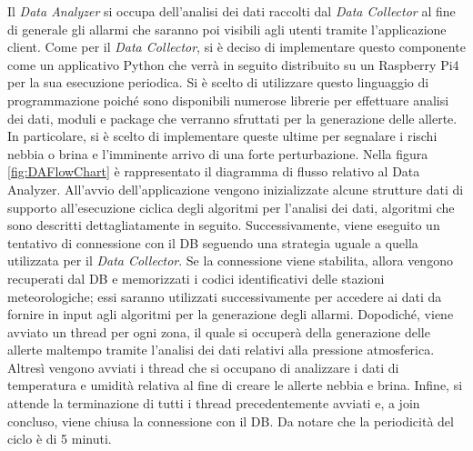 Il \textit{Data Analyzer} si occupa dell'analisi dei dati raccolti dal \textit{Data Collector} al fine di generale gli allarmi che saranno poi visibili agli utenti tramite l'applicazione client. Come per il \textit{Data Collector}, si è deciso di implementare questo componente come un applicativo Python che verrà in seguito distribuito su un Raspberry Pi4 per la sua esecuzione periodica. Si è scelto di utilizzare questo linguaggio di programmazione poiché sono disponibili numerose librerie per effettuare analisi dei dati, moduli e package che verranno sfruttati per la generazione delle allerte. In particolare, si è scelto di implementare queste ultime per segnalare i rischi nebbia o brina e l'imminente arrivo di una forte perturbazione. Nella figura \ref{fig:DAFlowChart} è rappresentato il diagramma di flusso relativo al Data Analyzer. All'avvio dell'applicazione vengono inizializzate alcune strutture dati di supporto all'esecuzione ciclica degli algoritmi per l'analisi dei dati, algoritmi che sono descritti dettagliatamente in seguito. Successivamente, viene eseguito un tentativo di connessione con il DB seguendo una strategia uguale a quella utilizzata per il \textit{Data Collector}. Se la connessione viene stabilita, allora vengono recuperati dal DB e memorizzati i codici identificativi delle stazioni meteorologiche; essi saranno utilizzati successivamente per accedere ai dati da fornire in input agli algoritmi per la generazione degli allarmi. Dopodiché, viene avviato un thread per ogni zona, il quale si occuperà della generazione delle allerte maltempo tramite l'analisi dei dati relativi alla pressione atmosferica. Altresì vengono avviati i thread che si occupano di analizzare i dati di temperatura e umidità relativa al fine di creare le allerte nebbia e brina. Infine, si attende la terminazione di tutti i thread precedentemente avviati e, a join concluso, viene chiusa la connessione con il DB. Da notare che la periodicità del ciclo è di 5 minuti.

